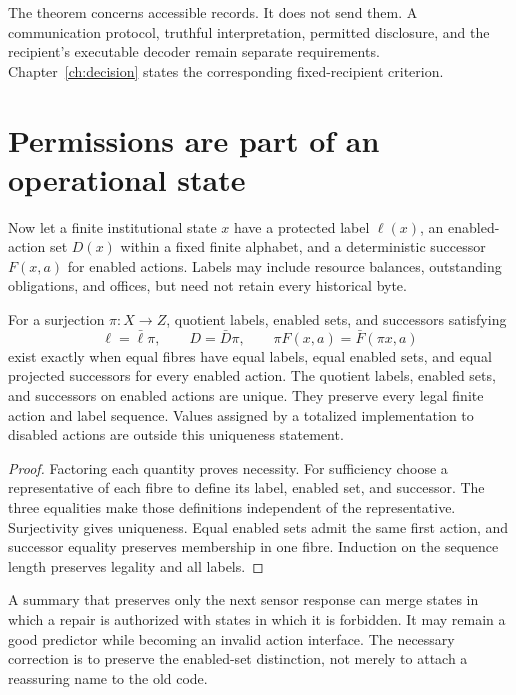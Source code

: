 The theorem concerns accessible records. It does not send them. A communication protocol, truthful interpretation, permitted disclosure, and the recipient's executable decoder remain separate requirements. Chapter~\ref{ch:decision} states the corresponding fixed-recipient criterion.

\section{Permissions are part of an operational state}
Now let a finite institutional state $x$ have a protected label $\ell(x)$, an enabled-action set $D(x)$ within a fixed finite alphabet, and a deterministic successor $F(x,a)$ for enabled actions. Labels may include resource balances, outstanding obligations, and offices, but need not retain every historical byte.

\begin{theorem}\label{r:governance}
For a surjection $\pi:X\to Z$, quotient labels, enabled sets, and successors satisfying
\[
\ell=\bar\ell\pi,\qquad D=\bar D\pi,\qquad
\pi F(x,a)=\bar F(\pi x,a)
\]
exist exactly when equal fibres have equal labels, equal enabled sets, and equal projected successors for every enabled action. The quotient labels, enabled sets, and successors on enabled actions are unique. They preserve every legal finite action and label sequence. Values assigned by a totalized implementation to disabled actions are outside this uniqueness statement.
\end{theorem}
\begin{proof}
Factoring each quantity proves necessity. For sufficiency choose a representative of each fibre to define its label, enabled set, and successor. The three equalities make those definitions independent of the representative. Surjectivity gives uniqueness. Equal enabled sets admit the same first action, and successor equality preserves membership in one fibre. Induction on the sequence length preserves legality and all labels.
\end{proof}

A summary that preserves only the next sensor response can merge states in which a repair is authorized with states in which it is forbidden. It may remain a good predictor while becoming an invalid action interface. The necessary correction is to preserve the enabled-set distinction, not merely to attach a reassuring name to the old code.

